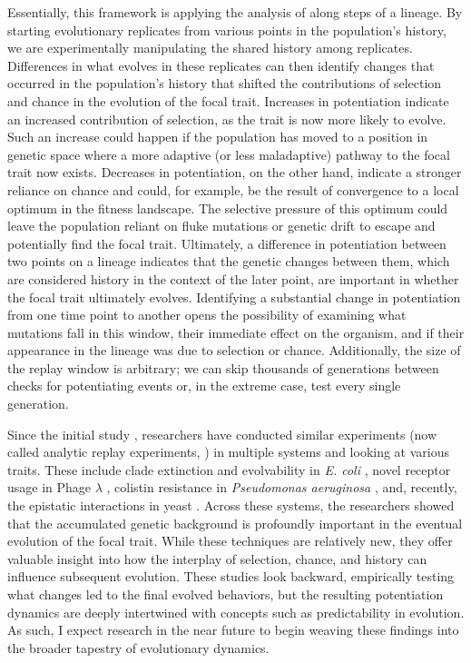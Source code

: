 Essentially, this framework is applying the analysis of \citet{travisanoExperimentalTestsRoles1995} along steps of a lineage.
By starting evolutionary replicates from various points in the population's history, we are experimentally manipulating the shared history among replicates.
Differences in what evolves in these replicates can then identify changes that occurred in the population's history that shifted the contributions of selection and chance in the evolution of the focal trait.
Increases in potentiation indicate an increased contribution of selection, as the trait is now more likely to evolve. 
Such an increase could happen if the population has moved to a position in genetic space where a more adaptive (or less maladaptive) pathway to the focal trait now exists. 
Decreases in potentiation, on the other hand, indicate a stronger reliance on chance and could, for example, be the result of convergence to a local optimum in the fitness landscape.
The selective pressure of this optimum could leave the population reliant on fluke mutations or genetic drift to escape and potentially find the focal trait.
Ultimately, a difference in potentiation between two points on a lineage indicates that the genetic changes between them, which are considered history in the context of the later point, are important in whether the focal trait ultimately evolves.
Identifying a substantial change in potentiation from one time point to another opens the possibility of examining what mutations fall in this window, their immediate effect on the organism, and if their appearance in the lineage was due to selection or chance.
Additionally, the size of the replay window is arbitrary; we can skip thousands of generations between checks for potentiating events or, in the extreme case, test every single generation. 

Since the initial study \citep{blountHistoricalContingencyEvolution2008}, researchers have conducted similar experiments (now called analytic replay experiments, \citep{blountContingencyDeterminismEvolution2018}) in multiple systems and looking at various traits. 
These include clade extinction and evolvability in \textit{E. coli} \citep{woodsSecondorderSelectionEvolvability2011, turnerReplayingEvolutionTest2015}, novel receptor usage in Phage $\lambda$ \citep{meyerRepeatabilityContingencyEvolution2012, guptaHostparasiteCoevolutionPromotes2022}, colistin resistance in \textit{Pseudomonas aeruginosa} \citep{jochumsenEvolutionAntimicrobialPeptide2016a}, and, recently, the epistatic interactions in yeast \citep{vignognaExploringLocalGenetic2021}.
Across these systems, the researchers showed that the accumulated genetic background is profoundly important in the eventual evolution of the focal trait. 
While these techniques are relatively new, they offer valuable insight into how the interplay of selection, chance, and history can influence subsequent evolution. 
These studies look backward, empirically testing what changes led to the final evolved behaviors, but the resulting potentiation dynamics are deeply intertwined with concepts such as predictability in evolution. 
As such, I expect research in the near future to begin weaving these findings into the broader tapestry of evolutionary dynamics.